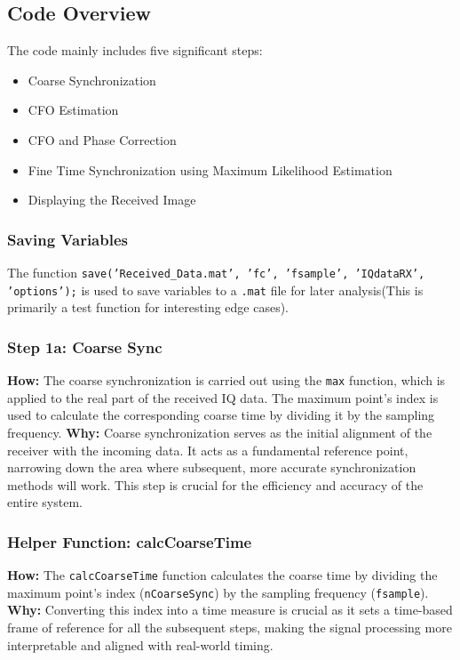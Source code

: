 \documentclass{article}
\begin{document}
\subsection*{Code Overview}
The code mainly includes five significant steps:

\begin{itemize}
    \item Coarse Synchronization
    \item CFO Estimation
    \item CFO and Phase Correction
    \item Fine Time Synchronization using Maximum Likelihood Estimation
    \item Displaying the Received Image
\end{itemize}

\subsubsection*{Saving Variables}
The function \texttt{save('Received\_Data.mat', 'fc', 'fsample', 'IQdataRX', 'options');} is used to save variables to a \texttt{.mat} file for later analysis(This is primarily a test function for interesting edge cases).

\subsubsection*{Step 1a: Coarse Sync}
\textbf{How:} 
The coarse synchronization is carried out using the \texttt{max} function, which is applied to the real part of the received IQ data. The maximum point's index is used to calculate the corresponding coarse time by dividing it by the sampling frequency.
\newline \textbf{Why:} 
Coarse synchronization serves as the initial alignment of the receiver with the incoming data. It acts as a fundamental reference point, narrowing down the area where subsequent, more accurate synchronization methods will work. This step is crucial for the efficiency and accuracy of the entire system.

\subsubsection*{Helper Function: calcCoarseTime}
\textbf{How:}
The \texttt{calcCoarseTime} function calculates the coarse time by dividing the maximum point's index (\texttt{nCoarseSync}) by the sampling frequency (\texttt{fsample}).
\newline \textbf{Why:}
Converting this index into a time measure is crucial as it sets a time-based frame of reference for all the subsequent steps, making the signal processing more interpretable and aligned with real-world timing.
\end{document}
